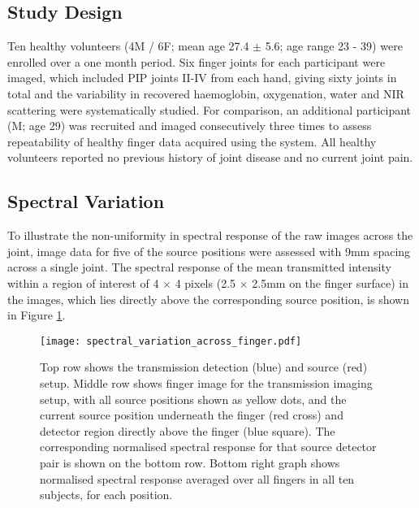 \documentclass[twoside]{bhamthesis}
\theoremstyle{definition}
\begin{document}
\subsection{Study Design}

Ten healthy volunteers (4M / 6F; mean age 27.4 $\pm$ 5.6; age range 23 - 39) were enrolled over a one month period. Six finger joints for each participant were imaged, which included  PIP joints II-IV from each hand, giving sixty joints in total and the variability in recovered haemoglobin, oxygenation, water and NIR scattering were systematically studied. For comparison, an additional participant (M; age 29) was recruited and imaged consecutively three times to assess repeatability of healthy finger data acquired using the system. All healthy volunteers reported no previous history of joint disease and no current joint pain.


\subsection{Spectral Variation}

To illustrate the non-uniformity in spectral response of the raw images across the joint, image data for five of the source positions were assessed with 9mm spacing across a single joint. The spectral response of the mean transmitted intensity within a region of interest of 4 $\times$ 4 pixels (2.5 $\times$ 2.5mm on the finger surface) in the images, which lies directly above the corresponding source position, is shown in Figure \ref{spectral_variation_across_finger}. 

\begin{figure}[!ht]
\centering\texttt{[image: spectral\_variation\_across\_finger.pdf]}
\caption{Top row shows the transmission detection (blue) and source (red) setup. Middle row shows finger image for the transmission imaging setup, with all source positions shown as yellow dots, and the current source position underneath the finger (red cross) and detector region directly above the finger (blue square). The corresponding normalised spectral response for that source detector pair is shown on the bottom row. Bottom right graph shows normalised spectral response averaged over all fingers in all ten subjects, for each position.}
\label{spectral_variation_across_finger}
\end{figure}
\end{document}
